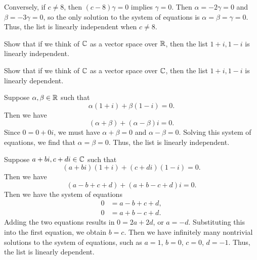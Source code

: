 \begin{exc}
\begin{solution}
Conversely, if $c\ne8$, then $(c-8)\gamma=0$ implies $\gamma=0$. Then
$\alpha=-2\gamma=0$ and $\beta=-3\gamma=0$, so the only solution to the system
of equations is $\alpha=\beta=\gamma=0$. Thus, the list is linearly
independent when $c\ne8$.
\end{solution}

\begin{exercise}\leavevmode
\begin{parts}
\item Show that if we think of $\mathbb{C}$ as a vector space over $\mathbb{R}$, then the list
  $1+i,1-i$ is linearly independent.
\item Show that if we think of $\mathbb{C}$ as a vector space over $\mathbb{C}$, then the list
  $1+i,1-i$ is linearly dependent.
\end{parts}
\end{exercise}
\begin{solution}\leavevmode
\begin{parts}
\item Suppose $\alpha,\beta\in\mathbb{R}$ such that
  \[ \alpha(1+i)+\beta(1-i)=0. \]
  Then we have
  \[ (\alpha+\beta)+(\alpha-\beta)i=0. \]
  Since $0=0+0i$, we must have $\alpha+\beta=0$ and $\alpha-\beta=0$. Solving
  this system of equations, we find that $\alpha=\beta=0$. Thus, the list is
  linearly independent.
\item Suppose $a+bi,c+di\in\mathbb{C}$ such that
  \[ (a+bi)(1+i)+(c+di)(1-i)=0. \]
  Then we have
  \[ (a-b+c+d)+(a+b-c+d)i=0. \]
  Then we have the system of equations
  \begin{align*}
  0 &= a-b+c+d,\\
  0 &= a+b-c+d.
  \end{align*}
  Adding the two equations results in $0=2a+2d$, or $a=-d$. Substituting this
  into the first equation, we obtain $b=c$. Then we have infinitely many
  nontrivial solutions to the system of equations, such as $a=1$, $b=0$,
  $c=0$, $d=-1$. Thus, the list is linearly dependent.
\end{parts}
\end{solution}


\end{exc}

